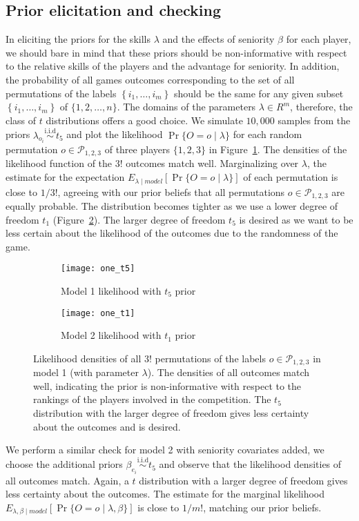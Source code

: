 \subsection{Prior elicitation and checking}
In eliciting the priors for the skills $\lambda$ and the effects of seniority $\beta$ for each player, we should bare in mind that these priors should be non-informative with respect to the relative skills of the players and the advantage for seniority. In addition, the probability of all games outcomes corresponding to the set of all permutations of the labels $\left\{i_{1}, \ldots, i_{m}\right\}$ should be the same for any given subset $\left\{i_{1}, \ldots, i_{m}\right\}$ of $\{1,2, \ldots, n\}$. The domains of the parameters $\lambda \in R^{m}$, therefore, the class of $t$ distributions offers a good choice. We simulate $10,000$ samples from the priors $\lambda_{o_{i}} \stackrel{\text{i.i.d}}{\sim} t_5$ and plot the likelihood $\operatorname{Pr}\{O=o \mid \lambda\}$ for each random permutation $o \in \mathcal{P}_{1, 2, 3}$ of three players $\{1, 2, 3\}$ in Figure~\ref{fig:3a}. The densities of the likelihood function of the $3!$ outcomes match well. Marginalizing over $\lambda$, the estimate for the expectation $E_{\lambda \mid model} \left[ \operatorname{Pr}\{O=o \mid \lambda\} \right]$ of each permutation is close to $1/3!$, agreeing with our prior beliefs that all permutations $o \in \mathcal{P}_{1, 2, 3}$ are equally probable. The distribution becomes tighter as we use a lower degree of freedom $t_{1}$ (Figure~\ref{fig:3b}). The larger degree of freedom $t_{5}$ is desired as we want to be less certain about the likelihood of the outcomes due to the randomness of the game.
\begin{figure}[ht!]
\centering
\begin{subfigure}[b]{0.45\textwidth}
   \texttt{[image: one\_t5]}
   \caption{Model 1 likelihood with $t_{5}$ prior} \label{fig:3a}
\end{subfigure}
\begin{subfigure}[b]{0.45\textwidth}
   \texttt{[image: one\_t1]}
   \caption{Model 2 likelihood with $t_{1}$ prior} \label{fig:3b}
\end{subfigure} \hspace{1em}
\caption{Likelihood densities of all $3!$ permutations of the labels $o \in \mathcal{P}_{1, 2, 3}$ in model 1 (with parameter $\lambda$). The densities of all outcomes match well, indicating the prior is non-informative with respect to the rankings of the players involved in the competition. The $t_{5}$ distribution with the larger degree of freedom gives less certainty about the outcomes and is desired.} \label{fig:3}
\end{figure}

We perform a similar check for model 2 with seniority covariates added, we choose the additional priors $\beta_{e_{i}} \stackrel{ \text{i.i.d}}{\sim} t_5$ and observe that the likelihood densities of all outcomes match. Again, a $t$ distribution with a larger degree of freedom gives less certainty about the outcomes. The estimate for the marginal likelihood $E_{\lambda, \beta \mid model} \left[ \operatorname{Pr}\{O=o \mid \lambda, \beta\} \right]$ is close to $1/m!$, matching our prior beliefs.
